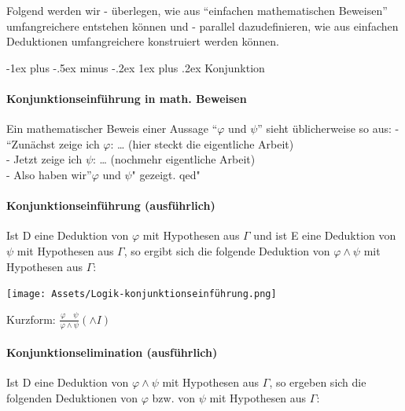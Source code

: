 \documentclass[a4paper]{article}
\makeatletter
\renewcommand{\subsubsection}{\@startsection{subsubsection}{3}{0mm}%
                {-1ex plus -.5ex minus -.2ex}%
                {1ex plus .2ex}%
                {\normalfont\small\bfseries}}
\makeatother
\begin{document}
\begin{multicols}{3}
  Folgend werden wir - überlegen, wie aus ``einfachen mathematischen
  Beweisen'' umfangreichere entstehen können und - parallel
  dazudefinieren, wie aus einfachen Deduktionen umfangreichere konstruiert
  werden können.

  \subsubsection{Konjunktion}\label{konjunktion}

  \paragraph{Konjunktionseinführung in math.
    Beweisen}\label{konjunktionseinfuxfchrung-in-math.-beweisen}

  Ein mathematischer Beweis einer Aussage ``$\varphi$ und $\psi$'' sieht
  üblicherweise so aus: - ``Zunächst zeige ich $\varphi$: \ldots{} (hier
  steckt die eigentliche Arbeit)\\- Jetzt zeige ich $\psi$: \ldots{}
  (nochmehr eigentliche Arbeit)\\- Also haben wir''$\varphi$ und $\psi$"
  gezeigt. qed"

  \paragraph{Konjunktionseinführung
    (ausführlich)}\label{konjunktionseinfuxfchrung-ausfuxfchrlich}

  Ist D eine Deduktion von $\varphi$ mit Hypothesen aus $\Gamma$ und ist E
  eine Deduktion von $\psi$ mit Hypothesen aus $\Gamma$, so ergibt sich
  die folgende Deduktion von $\varphi\wedge\psi$ mit Hypothesen aus
  $\Gamma$:


  \texttt{[image: Assets/Logik-konjunktionseinführung.png]}

  Kurzform: $\frac{\varphi\quad\psi}{\varphi\wedge\psi} (\wedge I)$

  \paragraph{Konjunktionselimination
    (ausführlich)}\label{konjunktionselimination-ausfuxfchrlich}

  Ist D eine Deduktion von $\varphi\wedge\psi$ mit Hypothesen aus
  $\Gamma$, so ergeben sich die folgenden Deduktionen von $\varphi$ bzw.
  von $\psi$ mit Hypothesen aus $\Gamma$:



\end{multicols}
\end{document}

